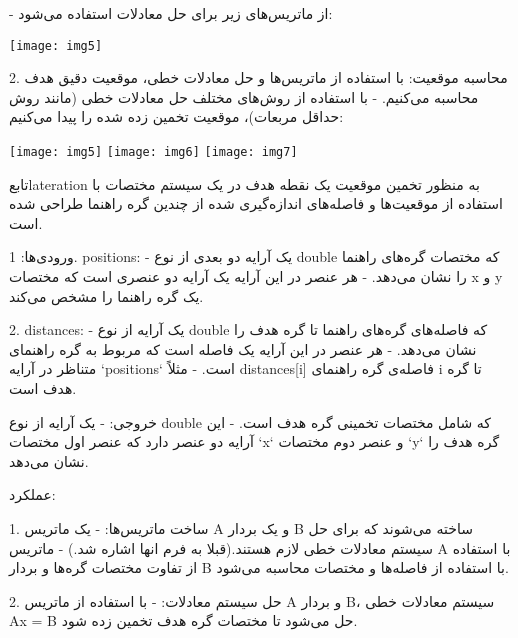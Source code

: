 \documentclass[]{report}
\begin{document}
- از ماتریس‌های زیر برای حل معادلات استفاده می‌شود:
\begin{center}
	\texttt{[image: img5]}

	
\end{center}

2.	محاسبه موقعیت: با استفاده از ماتریس‌ها و حل معادلات خطی، موقعیت دقیق هدف محاسبه می‌کنیم.
- با استفاده از روش‌های مختلف حل معادلات خطی (مانند روش حداقل مربعات)، موقعیت تخمین زده شده را پیدا می‌کنیم:
\begin{center}
	\texttt{[image: img5]}
	\texttt{[image: img6]}
	\texttt{[image: img7]}
	
	
\end{center}
تابعlateration  به منظور تخمین موقعیت یک نقطه هدف در یک سیستم مختصات با استفاده از موقعیت‌ها و فاصله‌های اندازه‌گیری شده از چندین گره راهنما طراحی شده است.

ورودی‌ها:
1. positions: 
- یک آرایه دو بعدی از نوع double که مختصات گره‌های راهنما را نشان می‌دهد.
- هر عنصر در این آرایه یک آرایه دو عنصری است که مختصات x و y یک گره راهنما را مشخص می‌کند.

2. distances: 
- یک آرایه از نوع double که فاصله‌های گره‌های راهنما تا گره هدف را نشان می‌دهد.
- هر عنصر در این آرایه یک فاصله است که مربوط به گره راهنمای متناظر در آرایه `positions` است.
- مثلاً distances[i] فاصله‌ی گره راهنمای i تا گره هدف است.

خروجی:
- یک آرایه از نوع  double که شامل مختصات تخمینی گره هدف است.
- این آرایه دو عنصر دارد که عنصر اول مختصات `x` و عنصر دوم مختصات `y` گره هدف را نشان می‌دهد.

عملکرد:


1. ساخت ماتریس‌ها:
- یک ماتریس A و یک بردار B ساخته می‌شوند که برای حل سیستم معادلات خطی لازم هستند.(قبلا به فرم انها اشاره شد.)
- ماتریس A با استفاده از تفاوت مختصات گره‌ها و بردار B با استفاده از فاصله‌ها و مختصات محاسبه می‌شود.

2. حل سیستم معادلات:
- با استفاده از ماتریس A و بردار B، سیستم معادلات خطی Ax = B حل می‌شود تا مختصات گره هدف تخمین زده شود.
\end{document}
